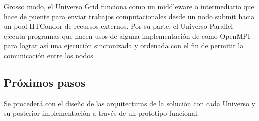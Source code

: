 Grosso modo, el Universo Grid funciona como un middleware o intermediario que hace de puente para enviar trabajos computacionales desde un nodo submit hacia un pool HTCondor de recursos externos. Por su parte, el Universo Parallel ejecuta programas que hacen usos de alguna implementación de \MPI como OpenMPI para lograr así una ejecución sincronizada y ordenada con el fin de permitir la comunicación entre los nodos.

\subsection{Próximos pasos}
Se procederá con el diseño de las arquitecturas de la solución con cada Universo y su posterior implementación a través de un prototipo funcional.

